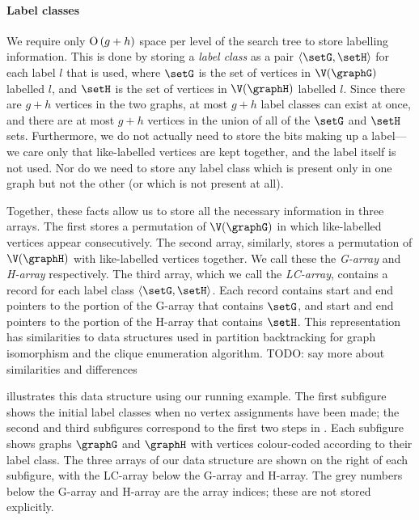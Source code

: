 \paragraph{Label classes} We require only $\operatorname{O}\left(g+h\right)$ space per level of the
search tree to store labelling information.  This is done by storing a
\emph{label class} as a pair $\langle \setG,\setH \rangle$ for each label $l$ that is
used, where $\setG$ is the set of vertices in $\V(\graphG)$ labelled $l$, and $\setH$ is the
set of vertices in $\V(\graphH)$ labelled $l$. Since there are $g + h$ vertices in the two graphs, at most
$g + h$ label classes can exist at once, and there are at most $g + h$ vertices
in the union of all of the $\setG$ and $\setH$ sets. Furthermore, we do not actually
need to store the bits making up a label---we care only that like-labelled
vertices are kept together, and the label itself is not used. Nor do we need to
store any label class which is present only in one graph but not the other (or
which is not present at all).

Together, these facts allow us to store all the
necessary information in three arrays.  The first 
stores a permutation of $\V(\graphG)$ in which like-labelled vertices appear
consecutively.  The second array, similarly, stores a permutation
of $\V(\graphH)$ with like-labelled vertices together.  We call these
the \emph{G-array} and \emph{H-array} respectively. The third array,
which we call the \emph{LC-array},
contains a record for each label class $\langle \setG,\setH \rangle$.  Each
record contains start and end pointers to the portion of the
G-array that contains $\setG$, and start and end pointers to the portion
of the H-array that contains $\setH$.
This representation has
similarities to data structures used in partition backtracking for graph isomorphism
\citep{DBLP:conf/wea/Lopez-PresaA09,DBLP:journals/jsc/McKayP14} and the \citet{DBLP:journals/cacm/BronK73}
clique enumeration algorithm.  TODO: say more about similarities and differences

 illustrates this data structure using our running example.
The first subfigure shows the initial label classes when no vertex assignments have
been made; the second and third subfigures correspond to the first two steps in .
Each subfigure shows graphs $\graphG$ and $\graphH$ with vertices colour-coded according
to their label class.  The three arrays of our data structure are shown on the right of each subfigure,
with the LC-array below the G-array and H-array.  The grey numbers below the G-array and H-array
are the array indices; these are not stored explicitly.

